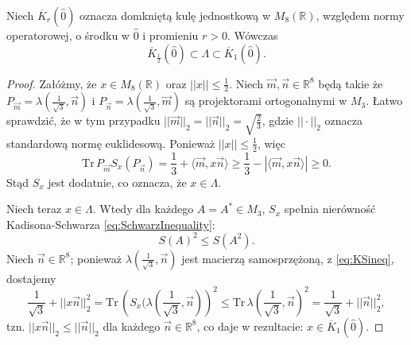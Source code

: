 {\begin{Theorem}
\label{thm:LambdaAndBalls}
    Niech $\overline{K}_{r}(\hat{0})$ oznacza domkniętą kulę jednostkową
w $M_{8}(\mathbb{R})$, względem normy operatorowej,
o środku w $\hat{0}$ i promieniu $r > 0$.
    Wówczas
    \begin{equation}
        \overline{K}_{\frac{1}{2}}(\hat{0})
            \subset \Lambda \subset \overline{K}_{1}(\hat{0}).
    \end{equation}
\end{Theorem}
\begin{proof}
    Załóżmy, że $x \in M_{8}(\mathbb{R})$ oraz $||x|| \leq \frac{1}{2}$.
    Niech $\vec{m}, \vec{n} \in \mathbb{R}^{8}$ będą takie że
    $P_{\vec{m}} = \lambda(\frac{1}{\sqrt{3}}, \vec{n})$ i
    $P_{\vec{n}} = \lambda(\frac{1}{\sqrt{3}}, \vec{m})$
    są projektorami ortogonalnymi w $M_{3}$.
Łatwo sprawdzić, że w tym przypadku
    $|| \vec{m} ||_{2} = || \vec{n} ||_{2} = \sqrt{\frac{2}{3}}$,
gdzie  $|| \cdot||_{2}$ oznacza standardową normę euklidesową.
Ponieważ $||x|| \leq \frac{1}{2}$, więc
    \begin{equation}
        \text{Tr} \, P_{\vec{m}} S_{x}(P_{\vec{n}}) =
        \frac{1}{3} + \langle \vec{m}, x \vec{n} \rangle \geq
        \frac{1}{3} - |\langle \vec{m}, x \vec{n} \rangle| \geq 0.
    \end{equation}
Stąd $S_{x}$ jest dodatnie, co oznacza, że $x \in \Lambda$.

Niech teraz $x \in \Lambda$.
Wtedy dla każdego $A = A^{*} \in M_{3}$, $S_{x}$
spełnia nierówność Kadisona-Schwarza \eqref{eq:SchwarzInequality}:
    \begin{equation}
     \label{eq:KSineq}
        S(A)^{2} \leq S(A^{2}).
    \end{equation}
Niech $\vec{n} \in \mathbb{R}^{8}$;
ponieważ $\lambda(\frac{1}{\sqrt{3}}, \vec{n})$
jest macierzą samosprzężoną, z \eqref{eq:KSineq}, dostajemy
    \begin{equation}
        \frac{1}{\sqrt{3}} + || x \vec{n} ||_{2}^{2} = \text{Tr}\,
        \left ( S_{x}(\lambda(\frac{1}{\sqrt{3}}, \vec{n}) \right)^{2} \leq
        \text{Tr}\, \lambda(\frac{1}{\sqrt{3}}, \vec{n})^{2} =
        \frac{1}{\sqrt{3}} + ||\vec{n}||_{2}^{2},
    \end{equation}
tzn. $||x\vec{n}||_{2} \leq ||\vec{n}||_{2}$
dla każdego $\vec{n} \in \mathbb{R}^{8}$,
co daje w rezultacie: $x \in \overline{K}_{1}(\hat{0})$.
\end{proof}

}
